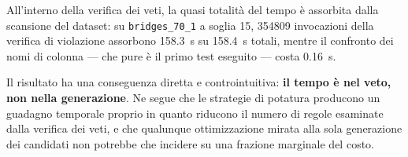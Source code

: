 All'interno della verifica dei veti, la quasi totalità del tempo è assorbita dalla scansione del
dataset: su \texttt{bridges\_70\_1} a soglia 15, \num{354809} invocazioni della verifica di
violazione assorbono \SI{158.3}{\second} su \SI{158.4}{\second} totali, mentre il confronto dei
nomi di colonna --- che pure è il primo test eseguito --- costa \SI{0.16}{\second}.

Il risultato ha una conseguenza diretta e controintuitiva: \textbf{il tempo è nel veto, non nella
generazione}. Ne segue che le strategie di potatura producono un guadagno temporale proprio in
quanto riducono il numero di regole esaminate dalla verifica dei veti, e che qualunque
ottimizzazione mirata alla sola generazione dei candidati non potrebbe che incidere su una
frazione marginale del costo.

